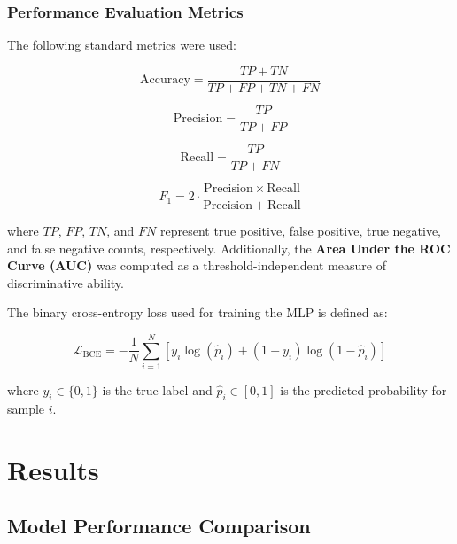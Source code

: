 \documentclass[12pt,a4paper]{article}
\begin{document}
\subsubsection{Performance Evaluation Metrics}

The following standard metrics were used:

\begin{equation}
\label{eq:accuracy}
\mathrm{Accuracy} = \frac{TP + TN}{TP + FP + TN + FN}
\end{equation}

\begin{equation}
\label{eq:precision}
\mathrm{Precision} = \frac{TP}{TP + FP}
\end{equation}

\begin{equation}
\label{eq:recall}
\mathrm{Recall} = \frac{TP}{TP + FN}
\end{equation}

\begin{equation}
\label{eq:f1}
F_1 = 2 \cdot \frac{\mathrm{Precision} \times \mathrm{Recall}}{\mathrm{Precision} + \mathrm{Recall}}
\end{equation}

\noindent where $TP$, $FP$, $TN$, and $FN$ represent true positive, false positive, true negative, and false negative counts, respectively. Additionally, the \textbf{Area Under the ROC Curve (AUC)} was computed as a threshold-independent measure of discriminative ability.

The binary cross-entropy loss used for training the MLP is defined as:

\begin{equation}
\label{eq:bce}
\mathcal{L}_{\mathrm{BCE}} = -\frac{1}{N}\sum_{i=1}^{N} \left[ y_i \log(\hat{p}_i) + (1 - y_i)\log(1 - \hat{p}_i) \right]
\end{equation}

\noindent where $y_i \in \{0,1\}$ is the true label and $\hat{p}_i \in [0,1]$ is the predicted probability for sample $i$.

\section{Results}
\label{sec:results}

\subsection{Model Performance Comparison}
\end{document}
